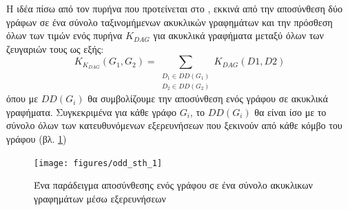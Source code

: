 Η ιδέα πίσω από τον πυρήνα  που προτείνεται στο \cite{Martino2012ATK}, εκκινά από την αποσύνθεση δύο γράφων σε ένα σύνολο ταξινομήμενων ακυκλικών γραφημάτων και την πρόσθεση όλων των τιμών ενός πυρήνα $K_{DAG}$ για ακυκλικά γραφήματα μεταξύ όλων των ζευγαριών τους ως εξής:
\begin{equation}
K_{K_{DAG}}(G_{1}, G_{2}) = \sum_{\substack{D_{1} \in DD(G_{1}) \\
D_{2} \in DD(G_{2})}} K_{DAG}(D1, D2)
\end{equation}
όπου με $DD(G_{i})$ θα συμβολίζουμε την αποσύνθεση ενός γράφου σε ακυκλικά γραφήματα.
Συγκεκριμένα για κάθε γράφο $G_{i}$, το $DD(G_{i})$ θα είναι ίσο με το σύνολο όλων των κατευθυνόμενων εξερευνήσεων  που ξεκινούν από κάθε κόμβο του γράφου (βλ. \ref{fig:odd:bfs_explorations})
\begin{figure}[]
\centering
\texttt{[image: figures/odd\_sth\_1]}
\caption{Ένα παράδειγμα αποσύνθεσης ενός γράφου σε ένα σύνολο ακυκλικων γραφημάτων μέσω εξερευνήσεων }
\label{fig:odd:bfs_explorations}
\end{figure}

